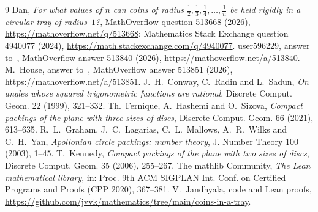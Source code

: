 \documentclass[11pt]{amsart}
\theoremstyle{remark}
\begin{document}
\begin{thebibliography}{9}
 Dan, \emph{For what values of $n$ can coins of radius $\frac12,\frac13,\frac14,\dots,\frac1n$ be held rigidly in a circular tray of radius~$1$?}, MathOverflow question 513668 (2026), \url{https://mathoverflow.net/q/513668}; Mathematics Stack Exchange question 4940077 (2024), \url{https://math.stackexchange.com/q/4940077}.
 user596229, answer to~\cite{MO}, MathOverflow answer 513840 (2026), \url{https://mathoverflow.net/a/513840}.
 M.~House, answer to~\cite{MO}, MathOverflow answer 513851 (2026), \url{https://mathoverflow.net/a/513851}.
 J.~H.~Conway, C.~Radin and L.~Sadun, \emph{On angles whose squared trigonometric functions are rational}, Discrete Comput. Geom. 22 (1999), 321--332.
 Th.~Fernique, A.~Hashemi and O.~Sizova, \emph{Compact packings of the plane with three sizes of discs}, Discrete Comput. Geom. 66 (2021), 613--635.
 R.~L.~Graham, J.~C.~Lagarias, C.~L.~Mallows, A.~R.~Wilks and C.~H.~Yan, \emph{Apollonian circle packings: number theory}, J. Number Theory 100 (2003), 1--45.
 T.~Kennedy, \emph{Compact packings of the plane with two sizes of discs}, Discrete Comput. Geom. 35 (2006), 255--267.
 The mathlib Community, \emph{The Lean mathematical library}, in: Proc. 9th ACM SIGPLAN Int. Conf. on Certified Programs and Proofs (CPP 2020), 367--381.
 V.~Jandhyala, code and Lean proofs, \url{https://github.com/jvvk/mathematics/tree/main/coins-in-a-tray}.
\end{thebibliography}
\end{document}
